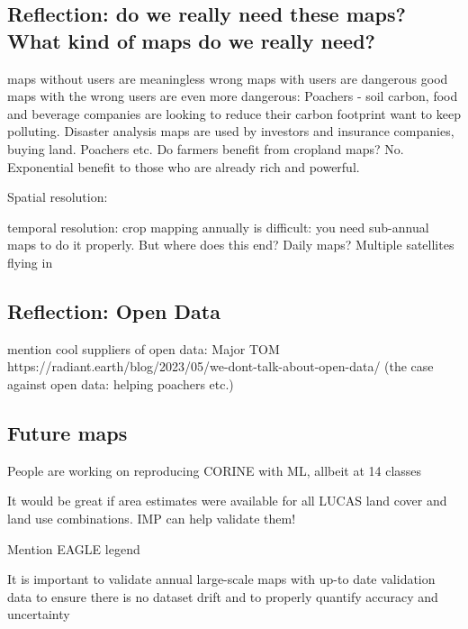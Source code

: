     
    \subsection{Reflection: do we really need these maps? What kind of maps do we really need?}

    maps without users are meaningless
    wrong maps with users are dangerous \citep{bastin2019global}
    good maps with the wrong users are even more dangerous: 
    Poachers \citep{beery2021can}- 
    soil carbon, food and beverage companies are looking to reduce their carbon footprint  want to keep polluting. Disaster analysis maps are used by investors and insurance companies, buying land. Poachers etc. Do farmers benefit from cropland maps? No.
    Exponential benefit to those who are already rich and powerful.
    
    Spatial resolution:
        
    temporal resolution:
    crop mapping annually is difficult: you need sub-annual maps to do it properly. But where does this end? Daily maps? Multiple satellites flying in 
    
    \subsection{Reflection: Open Data}
    mention cool suppliers of open data:
Major TOM \citep{francis2024major}
    https://radiant.earth/blog/2023/05/we-dont-talk-about-open-data/ (the case against open data: helping poachers etc.)
    \subsection{Future maps}
    
        People are working on reproducing CORINE with ML, allbeit at 14 classes \citep{bhugra2022rapidai4eo}

        It would be great if area estimates were available for all LUCAS land cover and land use combinations. IMP can help validate them!

        Mention EAGLE legend

        
        It is important to validate annual large-scale maps with up-to date validation data to ensure there is no dataset drift and to properly quantify accuracy and uncertainty \citep{tsendbazar2021towards}
    
    
            
                
            



        

